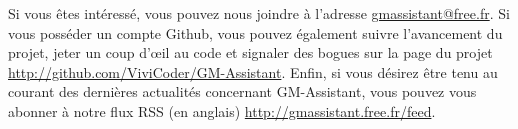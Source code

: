 \documentclass[a4paper,12pt]{article}
\begin{document}
Si vous êtes intéressé, vous pouvez nous joindre à l'adresse \url{gmassistant@free.fr}.
Si vous posséder un compte Github, vous pouvez également suivre l'avancement du projet, jeter un coup d'œil au code et signaler des bogues sur la page du projet \url{http://github.com/ViviCoder/GM-Assistant}.
Enfin, si vous désirez être tenu au courant des dernières actualités concernant GM-Assistant, vous pouvez vous abonner à notre flux RSS (en anglais) \url{http://gmassistant.free.fr/feed}.
\end{document}
